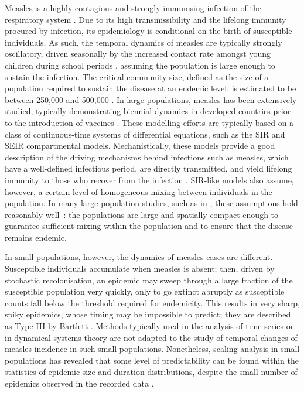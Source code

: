 \documentclass[10pt]{article}
\begin{document}
Measles is a highly contagious and strongly immunising infection of the respiratory system \cite{Anderson1991}. Due to its high transmissibility and the lifelong immunity procured by infection, its epidemiology is conditional on the birth of susceptible individuals. As such, the temporal dynamics of measles are typically strongly oscillatory, driven seasonally by the increased contact rate amongst young children during school periods \cite{London1973, Fine1982, Schenzle1984}, assuming the population is large enough to sustain the infection. The critical community size, defined as the size of a population required to sustain the disease at an endemic level, is estimated to be between 250,000 and 500,000 \cite{Bartlett1957, Black1966, Keeling1997}. In large populations, measles has been extensively studied, typically demonstrating biennial dynamics in developed countries prior to the introduction of vaccines \cite{Bolker1995, Grenfell1997}. These modelling efforts are typically based on a class of continuous-time systems of differential equations, such as the SIR and SEIR compartmental models. Mechanistically, these models provide a good description of the driving mechanisms behind infections such as measles, which have a well-defined infectious period, are directly transmitted, and yield lifelong immunity to those who recover from the infection \cite{Anderson1991}. SIR-like models also assume, however, a certain level of homogeneous mixing between individuals in the population. In many large-population studies, such as in \cite{Bjornstad2002}, these assumptions hold reasonably well~: the populations are large and spatially compact enough to guarantee sufficient mixing within the population and to ensure that the disease remains endemic. 

In small populations, however, the dynamics of measles cases are different. Susceptible individuals accumulate when measles is absent; then, driven by stochastic recolonisation, an epidemic may sweep through a large fraction of the susceptible population very quickly, only to go extinct abruptly as susceptible counts fall below the threshold required for endemicity. This results in very sharp, spiky epidemics, whose timing may be impossible to predict; they are described as Type III by Bartlett \cite{Bartlett1957}. Methods typically used in the analysis of time-series or in dynamical systems theory are not adapted to the study of temporal changes of measles incidence in such small populations. Nonetheless, scaling analysis in small populations has revealed that some level of predictability can be found within the statistics of epidemic size and duration distributions, despite the small number of epidemics observed in the recorded data \cite{Rhodes1996a, Rhodes1996b}.
\end{document}
